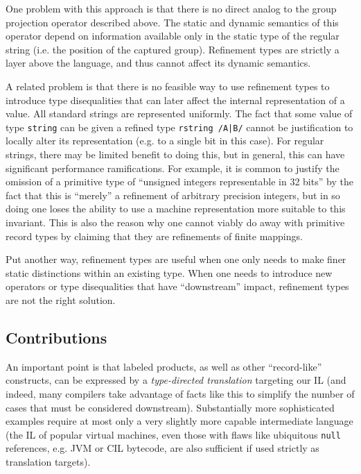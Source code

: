 One problem with this approach is that there is no direct analog to the group projection operator described above. The static and dynamic semantics of this operator depend on information available only in the static type of the regular string (i.e. the position of the captured group). Refinement types are strictly a layer above the language, and thus cannot affect its dynamic semantics.

A related problem is that there is no feasible way to use refinement types to introduce type disequalities that can later affect the internal representation of a value. All standard strings are represented uniformly. The fact that some value of type \lstinline{string} can be given a refined type \lstinline{rstring /A|B/} cannot be justification to locally alter its representation (e.g. to a single bit in this case). For regular strings, there may be limited benefit to doing this, but in general, this can have significant performance ramifications. For example, it is common to justify the omission of a primitive type of ``unsigned integers representable in 32 bits'' by the fact that this is ``merely'' a refinement of arbitrary precision integers, but in so doing one loses the ability to use a machine representation more suitable to this invariant.  %
This is also the reason why one cannot viably do away with primitive record types by claiming that they are refinements of finite mappings.

Put another way, refinement types are useful when one only needs to make finer static distinctions within an existing type. When one needs to introduce new operators or type disequalities that have ``downstream'' impact, refinement types are not the right solution.%

\subsection{Contributions}\label{sec:metamodules-approach}

An important point is that labeled products, as well as other ``record-like'' constructs, can  be expressed by a \emph{type-directed translation} targeting our IL (and indeed, many compilers take advantage of facts like this to simplify the number of cases that must be considered downstream). %
Substantially more sophisticated examples require at most only a very slightly more capable intermediate language (the IL of popular virtual machines, even those with flaws like ubiquitous \texttt{null} references, e.g. JVM or CIL bytecode, are also sufficient if used strictly as translation targets).

